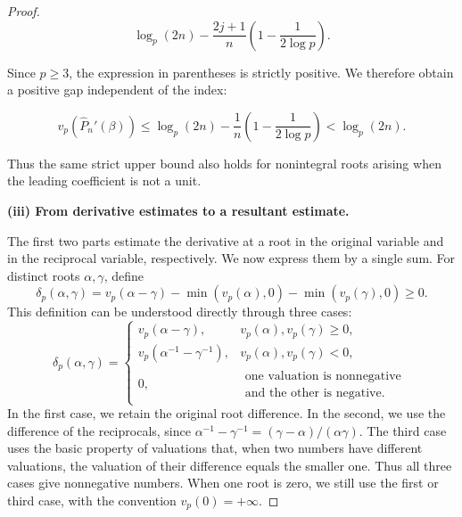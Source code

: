 \documentclass[11pt,a4paper]{article}
\numberwithin{equation}{section}
\theoremstyle{definition}
\begin{document}
\begin{proof}
\[
\log_p(2n)-\frac{2j+1}{n}
\left(1-\frac1{2\log p}\right).
\]

Since \(p\ge3\), the expression in parentheses is strictly positive. We therefore obtain a positive gap independent of the index:

\begin{equation}
v_p(\widehat P_n'(\beta))
\le\log_p(2n)-\frac1n\left(1-\frac1{2\log p}\right)
<\log_p(2n).
\label{eq:old4.7}
\end{equation}

Thus the same strict upper bound also holds for nonintegral roots arising when the leading coefficient is not a unit.

\textbf{(iii) From derivative estimates to a resultant estimate.}

The first two parts estimate the derivative at a root in the original variable and in the reciprocal variable, respectively. We now express them by a single sum. For distinct roots \(\alpha,\gamma\), define
\begin{equation}
\delta_p(\alpha,\gamma)
=v_p(\alpha-\gamma)-\min(v_p(\alpha),0)-\min(v_p(\gamma),0)\ge0.
\label{eq:old4.8}
\end{equation}
This definition can be understood directly through three cases:
\[
\delta_p(\alpha,\gamma)=
\begin{cases}
v_p(\alpha-\gamma),&v_p(\alpha),v_p(\gamma)\ge0,\\
v_p(\alpha^{-1}-\gamma^{-1}),&v_p(\alpha),v_p(\gamma)<0,\\
0,&\begin{array}{l}\text{one valuation is nonnegative}\\\text{and the other is negative}.\end{array}
\end{cases}
\]
In the first case, we retain the original root difference. In the second, we use the difference of the reciprocals, since
\(\alpha^{-1}-\gamma^{-1}=(\gamma-\alpha)/(\alpha\gamma)\).
The third case uses the basic property of valuations that, when two numbers have different valuations, the valuation of their difference equals the smaller one. Thus all three cases give nonnegative numbers. When one root is zero, we still use the first or third case, with the convention \(v_p(0)=+\infty\).


\end{proof}
\end{document}
